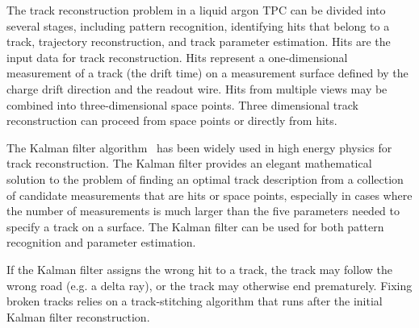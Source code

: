 The track reconstruction problem in a liquid argon TPC can be divided
into several stages, including pattern recognition, identifying hits
that belong to a track, trajectory reconstruction, and track parameter
estimation.
Hits are the input data for track reconstruction.  Hits represent a
one-dimensional measurement of a track (the drift time) on a
measurement surface defined by the charge drift direction and the
readout wire. Hits from multiple views may be combined into
three-dimensional space points. Three dimensional track reconstruction
can proceed from space points or directly from hits.

The Kalman filter algorithm~\cite{kalman} has been widely used in high
energy physics for track reconstruction. The Kalman filter provides an
elegant mathematical solution to the problem of finding an optimal
track description from a collection of candidate measurements that are
hits or space points, especially in cases where the number of
measurements is much larger than the five parameters needed to specify
a track on a surface.  The Kalman filter can be used for both pattern
recognition and parameter estimation.




If the Kalman filter assigns the wrong hit to a track, the track may follow
the wrong road (e.g. a delta ray), or the track may otherwise end
prematurely.  Fixing broken tracks relies on a track-stitching
algorithm that runs after the initial Kalman filter reconstruction.

